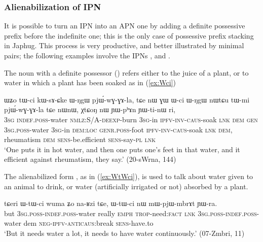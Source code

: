 \subsubsection{Alienabilization of IPN} \label{sec:alienabilization}
 It is possible to turn an IPN  into an APN one by adding a definite possessive prefix before the indefinite one; this is the only case of possessive prefix stacking in Japhug. This process is very productive, and better illustrated by minimal pairs; the following examples involve the IPNs ,  and .
 
The noun  with a definite possessor () refers either to the juice of a plant, or to water in which a plant has been soaked as in (\ref{ex:Wci})

  \begin{exe}
\ex \label{ex:Wci}
 \gll  ɯʑo tɯ-ci kɯ-sɤ-ɕke ɯ-ŋgɯ pjɯ́-wɣ-ɣɤ-la, tɕe nɯ ɣɯ ɯ-ci ɯ-ŋgɯ nɯtɕu tɯ-mi pjɯ́-wɣ-ɣɤ-la tɕe nɯnɯ, χtɕoŋ nɯ ɲɯ-pʰɤn ɲɯ-ti-nɯ ri, \\
\textsc{3sg}  \textsc{indef.poss}-water \textsc{nmlz}:S/A-\textsc{deexp}-burn \textsc{3sg}-in \textsc{ipfv}-\textsc{inv}-\textsc{caus}-soak \textsc{lnk} \textsc{dem} \textsc{gen} \textsc{3sg.poss}-water \textsc{3sg}-in \textsc{dem:loc}  \textsc{genr.poss}-foot  \textsc{ipfv}-\textsc{inv}-\textsc{caus}-soak \textsc{lnk} \textsc{dem}, rheumatism \textsc{dem} \textsc{sens}-be.efficient \textsc{sens}-say-\textsc{pl} \textsc{lnk}  \\
 \glt `One puts it in hot water, and then one puts one's feet in that water, and it efficient against rheumatism, they say.' (20-sWrna, 144)
 \end{exe}

The alienabilized form , as in (\ref{ex:WtWci}), is used to talk about water given to an animal to drink, or water (artificially irrigated or not) absorbed by a plant.

 \begin{exe}
\ex \label{ex:WtWci}
 \gll  tɕeri ɯ-tɯ-ci wuma ʑo na-ʁzi tɕe, ɯ-tɯ-ci nɯ mɯ-pjɯ-mbrɤt ɲɯ-ra. \\
 but \textsc{3sg.poss}-\textsc{indef.poss}-water really \textsc{emph} \textsc{trop}-need:\textsc{fact} \textsc{lnk} \textsc{3sg.poss}-\textsc{indef.poss}-water dem \textsc{neg-ipfv-anticaus}:break \textsc{sens}-have.to \\
 \glt  `But it needs water a lot, it needs to have water continuously.'  (07-Zmbri, 11)
 \end{exe}
 

